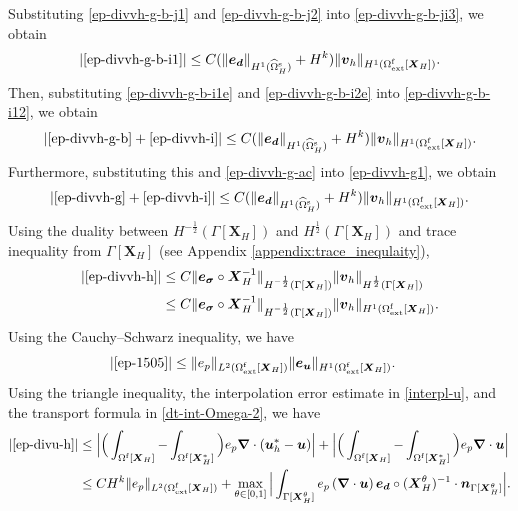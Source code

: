 \documentclass[11pt,reqno]{amsart}
\theoremstyle{definition}
\theoremstyle{plain}
\numberwithin{theorem}{section}
\numberwithin{proposition}{section}
\numberwithin{lemma}{section}
\numberwithin{equation}{section}
\newcommand{\bs}[1]{\boldsymbol{#1}}
\newcommand{\uu}[1]  {{\bs{#1}} }
\newcommand{\grad}   { \uu{\nabla}    }
\newcommand{\bu}{\uu{u}}
\renewcommand{\(}{\bigl(}
\renewcommand{\)}{\bigr)}
\begin{document}
Substituting \eqref{ep-divvh-g-b-j1} and \eqref{ep-divvh-g-b-j2} into \eqref{ep-divvh-g-b-ji3}, we obtain 
\begin{align}\label{ep-divvh-g-b-i1e}
|\eqref{ep-divvh-g-b-i1}|
\le C
(\|{\bs e}_{\bs d}\|_{H^1(\widehat\Omega^{\rm s}_H)} + H^{k}) \|{\bs v}_h\|_{H^1(\Omega^{\rm f}_{\rm ext}[{\bs X}_H])} .
\end{align}
Then, substituting \eqref{ep-divvh-g-b-i1e} and \eqref{ep-divvh-g-b-i2e} into \eqref{ep-divvh-g-b-i12}, we obtain 
\begin{align}
|\eqref{ep-divvh-g-b} + \eqref{ep-divvh-i} |
\le 
C(\|{\bs e}_{\bs d}\|_{H^1(\widehat\Omega^{\rm s}_H)} + H^{k}) \|{\bs v}_h\|_{H^1(\Omega^{\rm f}_{\rm ext}[{\bs X}_H])} .
\end{align}
Furthermore, substituting this and \eqref{ep-divvh-g-ac} into \eqref{ep-divvh-g1}, we obtain 
\begin{align}\label{ep-divvh-g-a-1}
|\eqref{ep-divvh-g} + \eqref{ep-divvh-i}|
\le 
C(\|{\bs e}_{\bs d}\|_{H^1(\widehat\Omega^{\rm s}_H)} + H^{k}) \|{\bs v}_h\|_{H^1(\Omega^{\rm f}_{\rm ext}[{\bs X}_H])} . 
\end{align}
Using the duality between $H^{-\frac12}(\Gamma[{\bs X}_H])$ and $H^{\frac12}(\Gamma[{\bs X}_H])$ and trace inequality from $\Gamma[{\bs X}_H]$ (see Appendix \ref{appendix:trace_inequlaity}), 
\begin{align}\label{ep-divvh-h-0.5}
|\eqref{ep-divvh-h}|
&\le C\|{\bs e}_{\bs\sigma}\circ{\bs X}_H^{-1}\|_{H^{-\frac12}(\Gamma[{\bs X}_H])} \|{\bs v}_h\|_{H^{\frac12}(\Gamma[{\bs X}_H])} \notag\\
&\le C\|{\bs e}_{\bs\sigma}\circ{\bs X}_H^{-1}\|_{H^{-\frac12}(\Gamma[{\bs X}_H])} \|{\bs v}_h\|_{H^1(\Omega^{\rm f}_{\rm ext}[{\bs X}_H])} . 
\end{align}
Using the Cauchy–Schwarz inequality, we have 
\begin{align}
|\eqref{ep-1505}| 
&\le \|e_p\|_{L^2(\Omega^{\rm f}_{\rm ext}[{\bs X}_H])}\|{\bs e}_{\bs u}\|_{H^1(\Omega^{\rm f}_{\rm ext}[\bs X_H])} . 
\end{align}
Using the triangle inequality, the interpolation error estimate in \eqref{interpl-u}, and the transport formula in \eqref{dt-int-Omega-2}, we have 
\begin{align*}
|\eqref{ep-divu-h}|
&\le \Big|\Big( \int_{\Omega^{\rm f}[\bs X_H]} - \int_{\Omega^{\rm f}[\bs X_H^*]} \Big) e_p \grad\cdot (\bu_h^*-\bu)\Big|
+ \Big|\Big( \int_{\Omega^{\rm f}[\bs X_H]} - \int_{\Omega^{\rm f}[\bs X_H^*]} \Big) e_p \grad\cdot \bu\Big| \\ 
&\le C H^k \|e_p\|_{L^2(\Omega^{\rm f}_{\rm ext}[{\bs X}_H])} + \max_{\theta\in[0,1]}\Big|\int_{\Gamma[{\bs X}_H^\theta]}e_p \, (\grad\cdot\bu) \, {\bs e}_{\bs d}\circ({\bs X}_H^\theta)^{-1}\cdot{\bs n}_{\Gamma[\bs X_H^\theta]} \Big| .
\end{align*}
\end{document}
